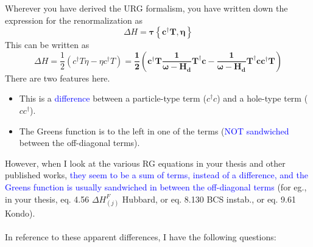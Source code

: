 \documentclass[14pt]{extarticle}
\begin{document}
Wherever you have derived the URG formalism, you have written down the expression for the renormalization as
\begin{equation}
	\label{eq1}
	\Delta H = \pmb{\tau \left\{c^\dagger T, \eta\right\}}
\end{equation}
This can be written as
\begin{equation}
	\label{eq2}
	\Delta H = \frac{1}{2}\left(c^\dagger T \eta - \eta c^\dagger T\right) =\pmb{ \frac{1}{2}\left(c^\dagger T \frac{1}{\omega - H_d}T^\dagger c - \frac{1}{\omega - H_d} T^\dagger c c^\dagger T\right)}
\end{equation}
There are two features here.
\begin{itemize}
	\item This is a \textcolor{blue}{difference} between a particle-type term (\(c^\dagger c\)) and a hole-type term (\(c c^\dagger\)).
	\item The Greens function is to the left in one of the terms (\textcolor{blue}{NOT sandwiched} between the off-diagonal terms).
\end{itemize}
However, when I look at the various RG equations in your thesis and other published works, \textcolor{blue}{they seem to be a \textcolor{blue}{sum} of terms, instead of a difference, and the Greens function is usually \textcolor{blue}{sandwiched in between} the off-diagonal terms} (for eg., in your thesis, eq. 4.56 \(\Delta H^F_{(j)}\) Hubbard, or eq. 8.130 BCS instab., or eq. 9.61 Kondo).
\\\\
In reference to these apparent differences, I have the following questions:
\end{document}
